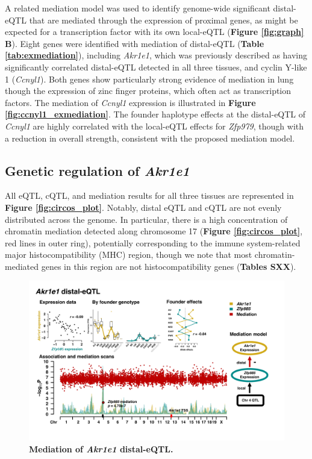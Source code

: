 A related mediation model was used to identify genome-wide significant distal-eQTL that are mediated through the expression of proximal genes, as might be expected for a transcription factor with its own local-eQTL (\textbf{Figure \ref{fig:graph} B}). Eight genes were identified with mediation of distal-eQTL (\textbf{Table \ref{tab:exmediation}}), including \textit{Akr1e1}, which was previously described as having significantly correlated distal-eQTL detected in all three tissues, and cyclin Y-like 1 (\textit{Ccnyl1}). Both genes show particularly strong evidence of mediation in lung though the expression of zinc finger proteins, which often act as transcription factors. The mediation of \textit{Ccnyl1} expression is illustrated in \textbf{Figure \ref{fig:ccnyl1_exmediation}}. The founder haplotype effects at the distal-eQTL of \textit{Ccnyl1} are highly correlated with the local-eQTL effects for \textit{Zfp979}, though with a reduction in overall strength, consistent with the proposed mediation model.

\subsection{Genetic regulation of \textit{Akr1e1}}

All eQTL, cQTL, and mediation results for all three tissues are represented in \textbf{Figure \ref{fig:circos_plot}}. Notably, distal eQTL and cQTL are not evenly distributed across the genome. In particular, there is a high concentration of chromatin mediation detected along chromosome 17 (\textbf{Figure \ref{fig:circos_plot}}, red lines in outer ring), potentially corresponding to the immune system-related major histocompatibility (MHC) region, though we note that most chromatin-mediated genes in this region are not histocompatibility genes (\textbf{Tables SXX}).

\begin{figure}[hp]
\renewcommand{\familydefault}{\sfdefault}\normalfont
\centering
\includegraphics[width=\textwidth, trim={0in 0.5in 0in 0in}, clip]{figs/akr1e1_mediation.pdf}
\caption{\textbf{Mediation of \textit{Akr1e1} distal-eQTL.} \label{fig:akr1e1_exmediation}}
\end{figure}

